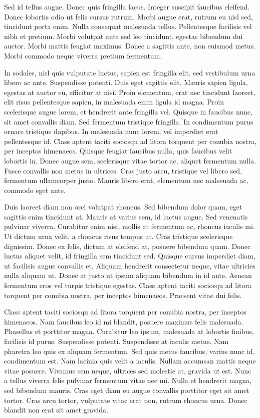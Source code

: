 Sed id tellus augue. Donec quis fringilla lacus. Integer suscipit faucibus eleifend. Donec lobortis odio ut felis cursus rutrum. Morbi augue erat, rutrum eu nisl sed, tincidunt porta enim. Nulla consequat malesuada tellus. Pellentesque facilisis vel nibh et pretium. Morbi volutpat ante sed leo tincidunt, egestas bibendum dui auctor. Morbi mattis feugiat maximus. Donec a sagittis ante, non euismod metus. Morbi commodo neque viverra pretium fermentum.

In sodales, nisl quis vulputate luctus, sapien est fringilla elit, sed vestibulum urna libero ac ante. Suspendisse potenti. Duis eget sagittis elit. Mauris sapien ligula, egestas at auctor eu, efficitur at nisi. Proin elementum, erat nec tincidunt laoreet, elit risus pellentesque sapien, in malesuada enim ligula id magna. Proin scelerisque augue lorem, et hendrerit ante fringilla vel. Quisque in faucibus nunc, sit amet convallis diam. Sed fermentum tristique fringilla. In condimentum purus ornare tristique dapibus. In malesuada nunc lorem, vel imperdiet erat pellentesque id. Class aptent taciti sociosqu ad litora torquent per conubia nostra, per inceptos himenaeos. Quisque feugiat faucibus nulla, quis faucibus velit lobortis in. Donec augue sem, scelerisque vitae tortor ac, aliquet fermentum nulla. Fusce convallis non metus in ultrices. Cras justo arcu, tristique vel libero sed, fermentum ullamcorper justo. Mauris libero erat, elementum nec malesuada ac, commodo eget ante.

Duis laoreet diam non orci volutpat rhoncus. Sed bibendum dolor quam, eget sagittis enim tincidunt at. Mauris at varius sem, id luctus augue. Sed venenatis pulvinar viverra. Curabitur enim nisi, mollis at fermentum ac, rhoncus iaculis mi. Ut dictum urna velit, a rhoncus risus tempus ut. Cras tristique scelerisque dignissim. Donec ex felis, dictum at eleifend at, posuere bibendum quam. Donec luctus aliquet velit, id fringilla sem tincidunt sed. Quisque cursus imperdiet diam, ut facilisis augue convallis et. Aliquam hendrerit consectetur neque, vitae ultricies nulla aliquam ut. Donec at justo ut ipsum aliquam bibendum in id ante. Aenean fermentum eros vel turpis tristique egestas. Class aptent taciti sociosqu ad litora torquent per conubia nostra, per inceptos himenaeos. Praesent vitae dui felis.

Class aptent taciti sociosqu ad litora torquent per conubia nostra, per inceptos himenaeos. Nam faucibus leo id mi blandit, posuere maximus felis malesuada. Phasellus et porttitor magna. Curabitur leo ipsum, malesuada at lobortis finibus, facilisis id purus. Suspendisse potenti. Suspendisse at iaculis metus. Nam pharetra leo quis ex aliquam fermentum. Sed quis metus faucibus, varius nunc id, condimentum est. Nam lacinia quis velit a iaculis. Nullam accumsan mattis neque vitae posuere. Vivamus sem neque, ultrices sed molestie at, gravida ut est. Nunc a tellus viverra felis pulvinar fermentum vitae nec mi. Nulla et hendrerit magna, sed bibendum mauris. Cras eget diam eu augue convallis porttitor eget sit amet tortor. Cras arcu tortor, vulputate vitae erat non, rutrum rhoncus urna. Donec blandit non erat sit amet gravida.

